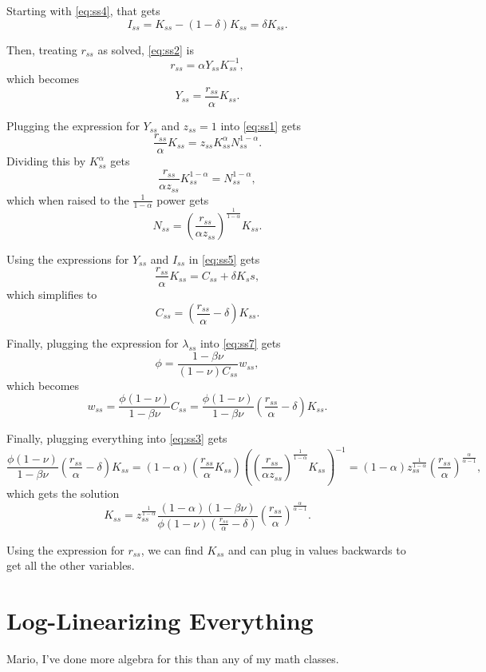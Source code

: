 \documentclass[11pt]{article}
\numberwithin{equation}{section} %
\numberwithin{figure}{section} %
\numberwithin{table}{section} %
\theoremstyle{definition}
\begin{document}
Starting with \ref{eq:ss4}, that gets
\[
    I_{ss} = K_{ss} - (1 - \delta) K_{ss} = \delta K_{ss}.
\]

Then, treating $r_{ss}$ as solved, \ref{eq:ss2} is
\[
    r_{ss} = \alpha Y_{ss} K_{ss}^{-1},
\]
which becomes
\[
    Y_{ss} = \frac{r_{ss}}{\alpha} K_{ss}.
\]

Plugging the expression for $Y_{ss}$ and $z_{ss} = 1$ into \ref{eq:ss1} gets
\[
    \frac{r_{ss}}{\alpha} K_{ss} = z_{ss} K_{ss}^\alpha N_{ss}^{1-\alpha}.
\]
Dividing this by $K_{ss}^\alpha$ gets
\[
    \frac{r_{ss}}{\alpha z_{ss}} K_{ss}^{1-\alpha} = N_{ss}^{1-\alpha},
\]
which when raised to the $\frac{1}{1-\alpha}$ power gets
\[
    N_{ss} = \left(\frac{r_{ss}}{\alpha z_{ss}}\right)^{\frac{1}{1-\alpha}} K_{ss}.
\]

Using the expressions for $Y_{ss}$ and $I_{ss}$ in \ref{eq:ss5} gets
\[
    \frac{r_{ss}}{\alpha} K_{ss} = C_{ss} + \delta K_ss,
\]
which simplifies to
\[
    C_{ss} = \left(\frac{r_{ss}}{\alpha} - \delta\right) K_{ss}.
\]

Finally, plugging the expression for $\lambda_{ss}$ into \ref{eq:ss7} gets
\[
    \phi = \frac{1 - \beta \nu}{(1-\nu) C_{ss}} w_{ss},
\]
which becomes
\[
    w_{ss} = \frac{\phi (1-\nu)}{1-\beta\nu} C_{ss} = \frac{\phi (1-\nu)}{1-\beta\nu} \left(\frac{r_{ss}}{\alpha} - \delta\right) K_{ss}.
\]

Finally, plugging everything into \ref{eq:ss3} gets
\[
    \frac{\phi (1-\nu)}{1-\beta\nu} \left(\frac{r_{ss}}{\alpha} - \delta\right) K_{ss} = (1-\alpha) \left(\frac{r_{ss}}{\alpha} K_{ss}\right)\left(\left(\frac{r_{ss}}{\alpha z_{ss}}\right)^{\frac{1}{1-\alpha}} K_{ss}\right)^{-1} = (1-\alpha) z_{ss}^{\frac{1}{1-\alpha}} \left(\frac{r_{ss}}{\alpha}\right)^{\frac{\alpha}{\alpha-1}},
\]
which gets the solution
\[
    K_{ss} = z_{ss}^{\frac{1}{1-\alpha}} \frac{(1-\alpha)(1-\beta \nu)}{\phi (1 - \nu) \left(\frac{r_{ss}}{\alpha} - \delta\right)} \left(\frac{r_{ss}}{\alpha}\right)^{\frac{\alpha}{\alpha-1}}.
\]

Using the expression for $r_{ss}$, we can find $K_{ss}$ and can plug in values backwards to get all the other variables.


\section{Log-Linearizing Everything} \label{sec:ll}

Mario, I've done more algebra for this than any of my math classes.
\end{document}
